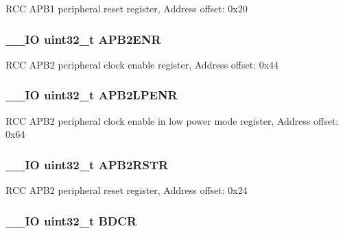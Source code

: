 R\-C\-C A\-P\-B1 peripheral reset register, Address offset\-: 0x20 \hypertarget{struct_r_c_c___type_def_acc7bb47dddd2d94de124f74886d919be}{
\subsubsection[{A\-P\-B2\-E\-N\-R}]{\setlength{\rightskip}{0pt plus 5cm}\-\_\-\-\_\-\-I\-O uint32\-\_\-t A\-P\-B2\-E\-N\-R}}\label{struct_r_c_c___type_def_acc7bb47dddd2d94de124f74886d919be}
R\-C\-C A\-P\-B2 peripheral clock enable register, Address offset\-: 0x44 \hypertarget{struct_r_c_c___type_def_aba51c57f9506e14a6f5983526c78943b}{
\subsubsection[{A\-P\-B2\-L\-P\-E\-N\-R}]{\setlength{\rightskip}{0pt plus 5cm}\-\_\-\-\_\-\-I\-O uint32\-\_\-t A\-P\-B2\-L\-P\-E\-N\-R}}\label{struct_r_c_c___type_def_aba51c57f9506e14a6f5983526c78943b}
R\-C\-C A\-P\-B2 peripheral clock enable in low power mode register, Address offset\-: 0x64 \hypertarget{struct_r_c_c___type_def_ab2c5389c9ff4ac188cd498b8f7170968}{
\subsubsection[{A\-P\-B2\-R\-S\-T\-R}]{\setlength{\rightskip}{0pt plus 5cm}\-\_\-\-\_\-\-I\-O uint32\-\_\-t A\-P\-B2\-R\-S\-T\-R}}\label{struct_r_c_c___type_def_ab2c5389c9ff4ac188cd498b8f7170968}
R\-C\-C A\-P\-B2 peripheral reset register, Address offset\-: 0x24 \hypertarget{struct_r_c_c___type_def_a0b9a3ced775287c8585a6a61af4b40e9}{
\subsubsection[{B\-D\-C\-R}]{\setlength{\rightskip}{0pt plus 5cm}\-\_\-\-\_\-\-I\-O uint32\-\_\-t B\-D\-C\-R}}\label{struct_r_c_c___type_def_a0b9a3ced775287c8585a6a61af4b40e9}
